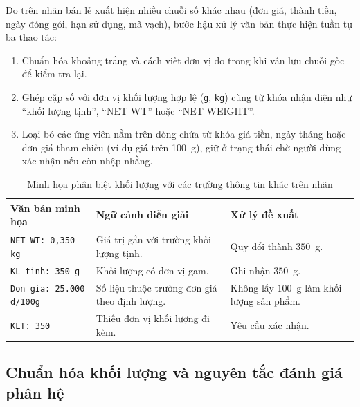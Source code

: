 Do trên nhãn bán lẻ xuất hiện nhiều chuỗi số khác nhau (đơn giá, thành tiền, ngày đóng gói, hạn sử dụng, mã vạch), bước hậu xử lý văn bản thực hiện tuần tự ba thao tác:
\begin{enumerate}[leftmargin=0.8cm, label=\arabic*), itemsep=2pt, topsep=2pt]
    \item Chuẩn hóa khoảng trắng và cách viết đơn vị đo trong khi vẫn lưu chuỗi gốc để kiểm tra lại.
    \item Ghép cặp số với đơn vị khối lượng hợp lệ (\texttt{g}, \texttt{kg}) cùng từ khóa nhận diện như ``khối lượng tịnh'', ``NET WT'' hoặc ``NET WEIGHT''.
    \item Loại bỏ các ứng viên nằm trên dòng chứa từ khóa giá tiền, ngày tháng hoặc đơn giá tham chiếu (ví dụ giá trên 100~g), giữ ở trạng thái chờ người dùng xác nhận nếu còn nhập nhằng.
\end{enumerate}

\begin{table}[htbp]
    \centering
    \caption{Minh họa phân biệt khối lượng với các trường thông tin khác trên nhãn}
    \label{tab:ocr-mass-normalization}
    \begingroup
    \small
    \setlength{\tabcolsep}{4pt}
    \renewcommand{\arraystretch}{1.15}
    \begin{tabularx}{\linewidth}{@{}>{\raggedright\arraybackslash}p{3.5cm}>{\raggedright\arraybackslash}X>{\raggedright\arraybackslash}p{3.2cm}@{}}
        \toprule
        \textbf{Văn bản minh họa} & \textbf{Ngữ cảnh diễn giải} & \textbf{Xử lý đề xuất} \\
        \midrule
        \texttt{NET WT: 0,350 kg} & Giá trị gắn với trường khối lượng tịnh. & Quy đổi thành $350$~g. \\
        \texttt{KL tinh: 350 g} & Khối lượng có đơn vị gam. & Ghi nhận $350$~g. \\
        \texttt{Don gia: 25.000 d/100g} & Số liệu thuộc trường đơn giá theo định lượng. & Không lấy $100$~g làm khối lượng sản phẩm. \\
        \texttt{KLT: 350} & Thiếu đơn vị khối lượng đi kèm. & Yêu cầu xác nhận. \\
        \bottomrule
    \end{tabularx}
    \endgroup
\end{table}

\subsection{Chuẩn hóa khối lượng và nguyên tắc đánh giá phân hệ}
\label{subsec:ocr-mass-nutrition}

